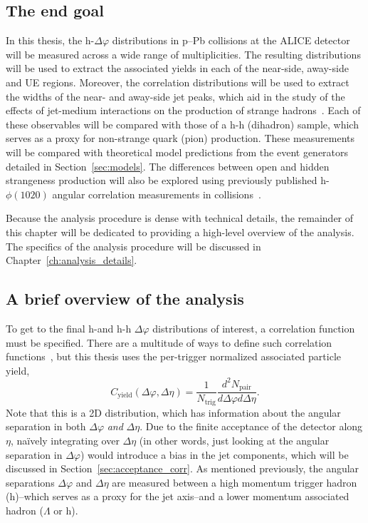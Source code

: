 \subsection{The end goal}

In this thesis, the h-\lmb $\Delta\varphi$ distributions in p--Pb collisions at the ALICE detector will be measured across a wide range of multiplicities. The resulting distributions will be used to extract the associated \lmb yields in each of the near-side, away-side and UE regions. Moreover, the correlation distributions will be used to extract the widths of the near- and away-side jet peaks, which aid in the study of the effects of jet-medium interactions on the production of strange hadrons~\cite{HFWidthPaper}. Each of these observables will be compared with those of a h-h (dihadron) sample, which serves as a proxy for non-strange quark (pion) production. These measurements will be compared with theoretical model predictions from the event generators detailed in Section~\ref{sec:models}. The differences between open and hidden strangeness production will also be explored using previously published h-$\phi(1020)$ angular correlation measurements in \pPb collisions~\cite{JustinPaper}. 

Because the analysis procedure is dense with technical details, the remainder of this chapter will be dedicated to providing a high-level overview of the analysis. The specifics of the analysis procedure will be discussed in Chapter~\ref{ch:analysis_details}.

\subsection{A brief overview of the analysis}
\label{sec:analysis}

To get to the final h-\lmb and h-h $\Delta\varphi$ distributions of interest, a correlation function must be specified. There are a multitude of ways to define such correlation functions~\cite{CorrelationFunction}, but this thesis uses the per-trigger normalized associated particle yield,
\begin{equation}
    C_{\text{yield}}(\Delta\varphi, \Delta\eta) = \frac{1}{N_{\text{trig}}}\frac{d^2N_{\text{pair}}}{d\Delta\varphi d\Delta\eta}.
\label{eq:corr}
\end{equation}
Note that this is a 2D distribution, which has information about the angular separation in both $\Delta\varphi$ \textit{and} $\Delta\eta$. Due to the finite acceptance of the detector along $\eta$, na\"ively integrating over $\Delta\eta$ (in other words, just looking at the angular separation in $\Delta\varphi$) would introduce a bias in the jet components, which will be discussed in Section~\ref{sec:acceptance_corr}. As mentioned previously, the angular separations $\Delta\varphi$ and $\Delta\eta$ are measured between a high momentum trigger hadron (h)--which serves as a proxy for the jet axis--and a lower momentum associated hadron ($\Lambda$ or h). 

